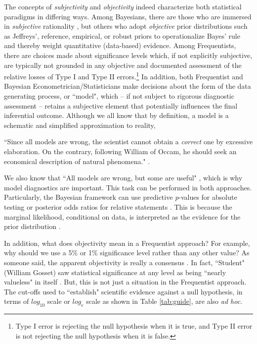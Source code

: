 The concepts of \textit{subjectivity} and \textit{objectivity} indeed characterize both statistical paradigms in differing ways. Among Bayesians, there are those who are immersed in \textit{subjective} rationality \cite{Ramsey1926, deFinetti1937, savage1954, Lindley2000}, but others who adopt \textit{objective} prior distributions such as Jeffreys', reference, empirical, or robust priors \cite{Bayes1763, Laplace1812, Jeffreys1961, Berger2006} to operationalize Bayes' rule and thereby weight quantitative (data-based) evidence. Among Frequentists, there are choices made about significance levels which, if not explicitly subjective, are typically not grounded in any objective and documented assessment of the relative losses of Type I and Type II errors.\footnote{Type I error is rejecting the null hypothesis when it is true, and Type II error is not rejecting the null hypothesis when it is false.} In addition, both Frequentist and Bayesian Econometrician/Statisticians make decisions about the form of the data generating process, or ``model", which -- if not subject to rigorous diagnostic assessment -- retains a subjective element that potentially influences the final inferential outcome. Although we all know that by definition, a model is a schematic and simplified approximation to reality,

``Since all models are wrong, the scientist cannot obtain a \textit{correct} one by excessive elaboration. On the contrary, following William of Occam, he should seek an economical description of natural phenomena." \cite{Box1976}.

We also know that ``All models are wrong, but some are useful" \cite{box1979robustness}, which is why model diagnostics are important. This task can be performed in both approaches. Particularly, the Bayesian framework can use predictive \textit{p}-values for absolute testing \cite{Gelman1996, Bayarri2000} or posterior odds ratios for relative statements \cite{Jeffreys1935, Kass1995}. This is because the marginal likelihood, conditional on data, is interpreted as the evidence for the prior distribution \cite{berger93}.

In addition, what does objectivity mean in a Frequentist approach? For example, why should we use a 5\% or 1\% significance level rather than any other value? As someone said, the apparent objectivity is really a consensus \cite{Lindley2000}. In fact, ``Student" (William Gosset) saw statistical significance at any level as being ``nearly valueless" in itself \cite{Ziliak2008}. But, this is not just a situation in the Frequentist approach. The cut-offs used to ``establish" scientific evidence against a null hypothesis, in terms of $log_{10}$ scale \cite{Jeffreys1961} or $log_{e}$ scale \cite{Kass1995} as shown in Table \ref{tab:guide}, are also \textit{ad hoc}.

